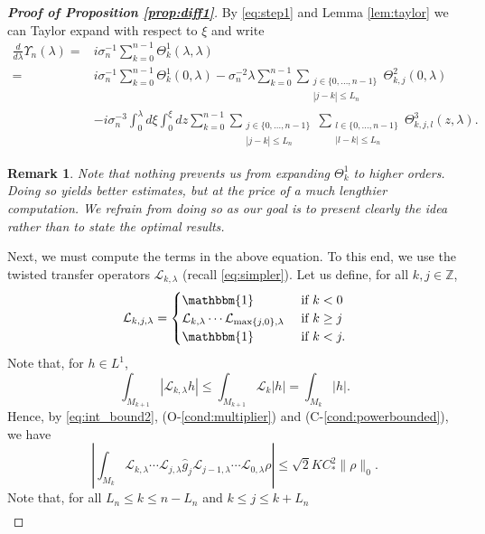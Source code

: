 \documentclass{amsart}
\numberwithin{equation}{section}
\newtheorem{rem}[thm]{Remark}
\newcommand\cL{{\mathcal L}}
\newcommand\bZ{{\mathbb Z}}
\newcommand\Id{{\mathbbm{1}}}
\begin{document}
\begin{proof}[\bf \em Proof of Proposition \ref{prop:diff1}]
By \eqref{eq:step1} and Lemma \ref{lem:taylor} we can Taylor expand with respect to $\xi$ and write
\begin{equation}\label{eq:step2}
\begin{split}
\frac{d}{d\lambda}\Upsilon_n(\lambda)=&i\sigma_n^{-1}\sum_{k=0}^{n-1}\Theta^1_{k}(\lambda,\lambda)\\
=&i\sigma_n^{-1}\sum_{k=0}^{n-1}\Theta^1_{k}(0,\lambda)-\sigma_n^{-2}\lambda\sum_{k=0}^{n-1}
\sum_{\substack{ j\in\{0,\dots, n-1\}\\ |j-k|\leq L_n}}\Theta^2_{k,j}(0,\lambda)\\
&-i\sigma_n^{-3}\int_0^\lambda d\xi\int_0^\xi dz \sum_{k=0}^{n-1}\sum_{\substack{ j\in\{0,\dots, n-1\}\\ |j-k|\leq L_n}}\sum_{\substack{ l\in\{0,\dots, n-1\}\\ |l-k|\leq L_n}}\Theta^3_{k,j,l}(z,\lambda).
\end{split}
\end{equation}
\begin{rem}
Note that nothing prevents us from expanding $\Theta^1_k$ to higher orders. Doing so yields better estimates, but at the price of a much lengthier computation. We refrain from doing so as our goal is to present clearly the idea rather than to state the optimal results.
\end{rem}
Next, we must compute the terms in the above equation. To this end, we use the twisted transfer operators  $\cL_{k, \lambda}$ (recall \eqref{eq:simpler}).
Let us define, for all $k,j\in\bZ$,
\begin{equation}\label{eq:transfer_gen}
\cL_{k,j,\lambda}=\begin{cases}
\Id &\textrm{ if } k<0\\
\cL_{k,\lambda}\cdots\cL_{\max\{j,0\},\lambda} &\textrm{ if } k\geq j\\
\Id &\textrm{ if } k< j.
\end{cases}
\end{equation}
Note that, for $h\in L^1$,
\[
\int_{M_{k+1}}\left|\cL_{k,\lambda} h\right|\leq \int_{M_{k+1}}\cL_{k} \left|h\right|=\int_{M_k}|h|.
\]
Hence, by \eqref{eq:int_bound2}, (O-\ref{cond:multiplier}) and (C-\ref{cond:powerbounded}), we have 
\[
\left|\int_{M_k}\cL_{k,\lambda}\cdots \cL_{j, \lambda}\hat g_j\cL_{j-1,\lambda}\cdots \cL_{0,\lambda} \rho\right|\leq \sqrt 2 K C_*^2\|\rho\|_0.
\]
Note that, for all $L_n \le k \le n - L_n$ and $k \leq j \le k + L_n$
 \begin{equation}\label{eq:Theta_PF}
 \begin{split}

\end{split}
\end{equation}
\end{proof}
\end{document}
